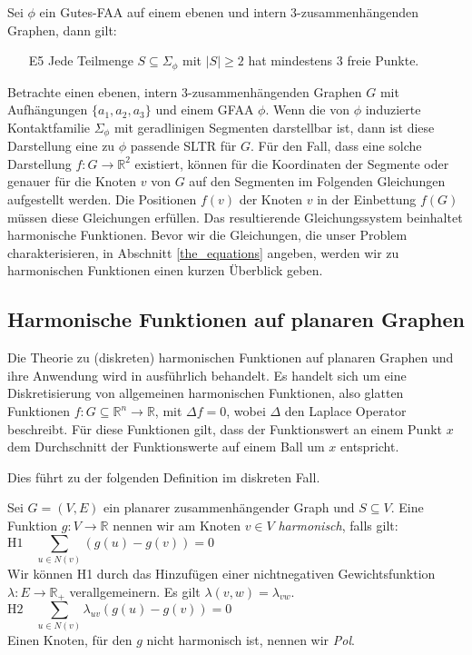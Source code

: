 \begin{lemma}\cite[Lemma 2.8]{af13}\label{lemma_af13}
Sei $\phi$ ein Gutes-FAA auf einem ebenen und intern 3-zusammenhängenden Graphen, dann gilt: 
\begin{itemize}
\item [E5] Jede Teilmenge $S \subseteq \Sigma_{\phi}$ mit $|S| \geq 2$ hat mindestens 3 freie Punkte.
\end{itemize}
\end{lemma}

Betrachte einen ebenen, intern 3-zusammenhängenden Graphen $G$ mit Aufhängungen $\{a_1,a_2,a_3\}$ und einem GFAA $\phi$. Wenn die von $\phi$ induzierte Kontaktfamilie $\Sigma_{\phi}$ mit geradlinigen Segmenten darstellbar ist, dann ist diese Darstellung eine zu $\phi$ passende SLTR für $G$. Für den Fall, dass eine solche Darstellung $f:G\to\mathbb{R}^2$ existiert, können für die Koordinaten der Segmente oder genauer für die Knoten $v$ von $G$ auf den Segmenten im Folgenden Gleichungen aufgestellt werden. Die Positionen $f(v)$ der Knoten $v$ in der Einbettung $f(G)$ müssen diese Gleichungen erfüllen. Das resultierende Gleichungssystem beinhaltet harmonische Funktionen. Bevor wir die Gleichungen, die unser Problem charakterisieren, in Abschnitt \ref{the_equations} angeben, werden wir zu harmonischen Funktionen einen kurzen Überblick geben.

\subsection{Harmonische Funktionen auf planaren Graphen}

Die Theorie zu (diskreten) harmonischen Funktionen auf planaren Graphen und ihre Anwendung wird in \cite{lov99} ausführlich behandelt. Es handelt sich um eine Diskretisierung von allgemeinen harmonischen Funktionen, also glatten Funktionen $f:G\subseteq \mathbb{R}^n \to \mathbb{R}$, mit $\Delta f = 0$, wobei $\Delta$ den Laplace Operator beschreibt. Für diese Funktionen gilt, dass der Funktionswert an einem Punkt $x$ dem Durchschnitt der Funktionswerte auf einem Ball um $x$ entspricht. 

Dies führt zu der folgenden Definition im diskreten Fall.

\begin{definition}
Sei $G=(V,E)$ ein planarer zusammenhängender Graph und $S \subseteq V$. Eine Funktion $g:V \to \mathbb{R}$ nennen wir am Knoten $v \in V$ \textit{harmonisch}, falls gilt:
$$ \text{H1} \quad \sum_{u \in N(v)}(g(u) - g(v)) = 0 \quad \qquad\qquad \qquad\qquad\qquad\qquad\qquad\qquad\qquad\quad\:\,\:$$
Wir können H1 durch das Hinzufügen einer nichtnegativen Gewichtsfunktion $\lambda:E\to\mathbb{R}_+$ verallgemeinern. Es gilt $\lambda(v,w) = \lambda_{vw}$.
$$ \text{H2}\quad \sum_{u \in N(v)}\lambda_{uv}(g(u) - g(v)) = 0 \quad\qquad \qquad\qquad \qquad\qquad\qquad\qquad\qquad\qquad$$
Einen Knoten, für den $g$ nicht harmonisch ist, nennen wir \textit{Pol}.
\end{definition}

